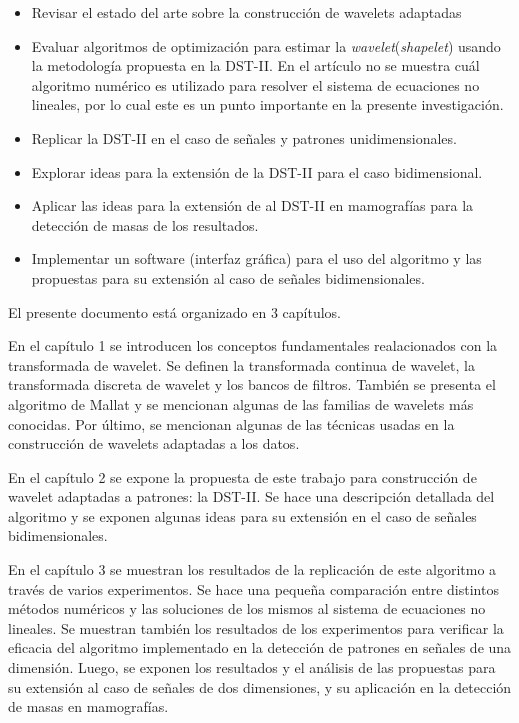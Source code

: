 \begin{itemize}
	\item Revisar el estado del arte sobre la construcción de wavelets adaptadas 
	\item Evaluar algoritmos de optimización para estimar la \textit{wavelet}(\textit{shapelet})
		usando la metodología propuesta en la DST-II. En el artículo \cite{Guido2018} no se muestra
		cuál algoritmo numérico es utilizado para resolver el sistema de ecuaciones no lineales, 
		por lo cual este es un punto importante en la presente investigación.
	\item Replicar la DST-II en el caso de señales y patrones unidimensionales. 
	\item Explorar ideas para la extensión de la DST-II para el caso bidimensional. 
	\item Aplicar las ideas para la extensión de al DST-II en mamografías para la detección de masas de los resultados.  
	\item Implementar un software (interfaz gráfica) para el uso del algoritmo y las propuestas para su extensión al caso de señales
		bidimensionales.
\end{itemize}

El presente documento está organizado en 3 capítulos.

En el capítulo 1 se introducen los conceptos fundamentales realacionados con la transformada de wavelet. Se definen
la transformada continua de wavelet, la transformada discreta de wavelet y los bancos de filtros.
También se presenta el algoritmo de Mallat y se mencionan algunas de las familias de wavelets más conocidas.
Por último, se mencionan algunas de las técnicas usadas en la construcción de wavelets adaptadas a los datos. 

En el capítulo 2 se expone la propuesta de este trabajo para construcción de wavelet adaptadas a patrones: 
la DST-II. Se hace una descripción detallada del algoritmo y se exponen algunas ideas para su extensión en el
caso de señales bidimensionales.

En el capítulo 3 se muestran los resultados de la replicación de este algoritmo a través de varios experimentos.
Se hace una pequeña comparación entre distintos métodos numéricos y las soluciones de los mismos al sistema de ecuaciones
no lineales. Se muestran también los resultados de los experimentos para verificar la eficacia del algoritmo implementado en  
la detección de patrones en señales de una dimensión. Luego, se exponen  los resultados y el análisis de las propuestas
para su extensión al caso de señales de dos dimensiones, y su aplicación en la detección de masas en mamografías.

